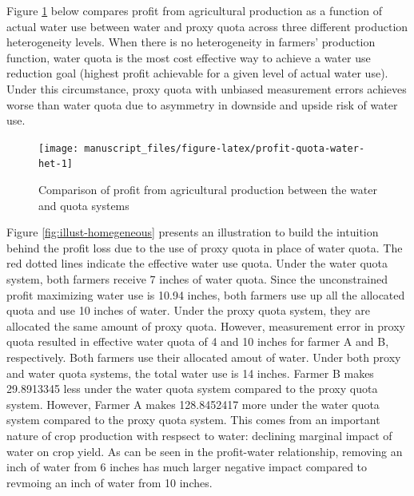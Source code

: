\documentclass[
]{article}
\begin{document}
Figure \ref{fig:profit-quota-water-het} below compares profit from agricultural production as a function of actual water use between water and proxy quota across three different production heterogeneity levels. When there is no heterogeneity in farmers' production function, water quota is the most cost effective way to achieve a water use reduction goal (highest profit achievable for a given level of actual water use). Under this circumstance, proxy quota with unbiased measurement errors achieves worse than water quota due to asymmetry in downside and upside risk of water use.

\begin{figure}[H]

{\centering \texttt{[image: manuscript\_files/figure-latex/profit-quota-water-het-1]} 

}

\caption{Comparison of profit from agricultural production between the water and quota systems}\label{fig:profit-quota-water-het}
\end{figure}

Figure \ref{fig:illust-homegeneous} presents an illustration to build the intuition behind the profit loss due to the use of proxy quota in place of water quota. The red dotted lines indicate the effective water use quota. Under the water quota system, both farmers receive 7 inches of water quota. Since the unconstrained profit maximizing water use is 10.94 inches, both farmers use up all the allocated quota and use 10 inches of water. Under the proxy quota system, they are allocated the same amount of proxy quota. However, measurement error in proxy quota resulted in effective water quota of 4 and 10 inches for farmer A and B, respectively. Both farmers use their allocated amout of water. Under both proxy and water quota systems, the total water use is 14 inches. Farmer B makes 29.8913345 less under the water quota system compared to the proxy quota system. However, Farmer A makes 128.8452417 more under the water quota system compared to the proxy quota system. This comes from an important nature of crop production with respsect to water: declining marginal impact of water on crop yield. As can be seen in the profit-water relationship, removing an inch of water from 6 inches has much larger negative impact compared to revmoing an inch of water from 10 inches.
\end{document}
